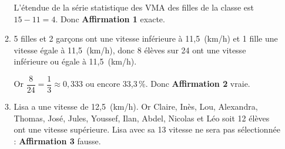 \begin{enumerate}
\begin{enumerate}
L'étendue de la série statistique des VMA des filles de la classe est $15 - 11 = 4$. Donc \textbf{Affirmation 1} exacte.
		\item %
5 filles et 2 garçons ont une vitesse inférieure à 11,5~(km/h) et 1 fille une vitesse égale à 11,5~(km/h), donc 8 élèves sur 24 ont une vitesse inférieure ou égale à 11,5~(km/h).

Or $\dfrac{8}{24} = \dfrac{1}{3} \approx 0,333$ ou encore 33,3\,\%. Donc \textbf{Affirmation 2} vraie.
		\item %

Lisa a une vitesse de 12,5~(km/h). Or Claire, Inès, Lou, Alexandra, Thomas, José, Jules, Youssef, Ilan, Abdel, Nicolas et Léo soit 12 élèves ont une vitesse supérieure. Lisa avec sa 13 vitesse ne sera pas sélectionnée : \textbf{Affirmation 3} fausse.
	\end{enumerate}
\end{enumerate}

\bigskip

